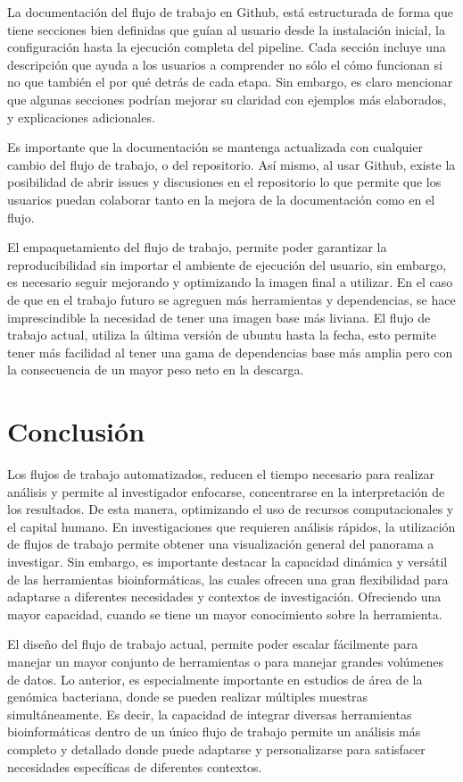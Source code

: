 \documentclass[12pt]{article}
\begin{document}
La documentación del flujo de trabajo en Github, está estructurada de forma que tiene secciones bien definidas que guían al usuario desde la instalación inicial, la configuración hasta la ejecución completa del pipeline. Cada sección incluye una descripción que ayuda a los usuarios a comprender no sólo el cómo funcionan si no que también el por qué detrás de cada etapa. Sin embargo, es claro mencionar que algunas secciones podrían mejorar su claridad con ejemplos más elaborados, y explicaciones adicionales.
	
Es importante que la documentación se mantenga actualizada con cualquier cambio del flujo de trabajo, o del repositorio. Así mismo, al usar Github, existe la posibilidad de abrir issues y discusiones en el repositorio lo que permite que los usuarios puedan colaborar tanto en la mejora de la documentación como en el flujo.

El empaquetamiento del flujo de trabajo, permite poder garantizar la reproducibilidad sin importar el ambiente de ejecución del usuario, sin embargo, es necesario seguir mejorando y optimizando la imagen final a utilizar. En el caso de que en el trabajo futuro se agreguen más herramientas y dependencias, se hace imprescindible la necesidad de tener una imagen base más liviana. El flujo de trabajo actual, utiliza la última versión de ubuntu hasta la fecha, esto permite tener más facilidad al tener una gama de dependencias base más amplia pero con la consecuencia de un mayor peso neto en la descarga. 



\newpage
\section{Conclusión}
Los flujos de trabajo automatizados, reducen el tiempo necesario para realizar análisis y permite al investigador enfocarse, concentrarse en la interpretación de los resultados. De esta manera, optimizando el uso de recursos computacionales y el capital humano. En investigaciones que requieren análisis rápidos, la utilización de flujos de trabajo permite obtener una visualización general del panorama a investigar. Sin embargo, es importante destacar la capacidad dinámica y versátil de las herramientas bioinformáticas, las cuales ofrecen una gran flexibilidad para adaptarse a diferentes necesidades y contextos de investigación. Ofreciendo una mayor capacidad, cuando se tiene un mayor conocimiento sobre la herramienta.


El diseño del flujo de trabajo actual, permite poder escalar fácilmente para manejar un mayor conjunto de herramientas o para manejar grandes volúmenes de datos. Lo anterior, es especialmente importante en estudios de área de la genómica bacteriana, donde se pueden realizar múltiples muestras simultáneamente. Es decir, la capacidad de integrar diversas herramientas bioinformáticas dentro de un único flujo de trabajo permite un análisis más completo y detallado donde puede adaptarse y personalizarse para satisfacer necesidades específicas de diferentes contextos. 
\end{document}
